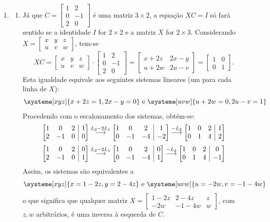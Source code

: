 \documentclass[12pt,a4paper]{article}
\makeatletter
\newenvironment{amatrix}[1]{%
  \left[\begin{array}{@{}*{#1}{c}|c@{}}
}{%
  \end{array}\right]
}
\newcommand{\grstep}[2][\relax]{%
   \ensuremath{\mathrel{
       {\mathop{\longrightarrow}\limits^{#2\mathstrut}_{
                                     \begin{subarray}{l} #1 \end{subarray}}}}}}
\makeatother
\begin{document}
\begin{enumerate}
\item
\begin{enumerate}
\item Já que $C = \begin{bmatrix}
1 & 2\\
0 & -1\\
2 & 0
\end{bmatrix}$ é uma matriz $3 \times 2$, a equação $XC = I$ só fará sentido se a identidade $I$ for $2 \times 2$ e a matriz $X$ for $2 \times 3$. Considerando $X = 
\begin{bmatrix}
x & y & z\\
u & v & w
\end{bmatrix}$, tem-se
\[
XC = 
\begin{bmatrix}
x & y & z\\
u & v & w
\end{bmatrix}
\cdot
\begin{bmatrix}
1 & 2\\
0 & -1\\
2 & 0
\end{bmatrix}
=
\begin{bmatrix}
x+2z & 2x-y\\
u+2w & 2u-v
\end{bmatrix}
=
\begin{bmatrix}
1 & 0\\
0 & 1
\end{bmatrix}.
\]
Esta igualdade equivale aos seguintes sistemas lineares (um para cada linha de $X$):
\[
\systeme[xyz]{
x+2z=1,
2x-y=0
}
\text{ e }
\systeme[uvw]{
u+2w=0,
2u-v=1
}
\]
Procedendo com o escalonamento dos sistemas, obtém-se:
\[
\begin{amatrix}{3}
1 &  0 & 2 & 1\\
2 & -1 & 0 & 0
\end{amatrix}
\grstep{ L_2 - 2 L_1 }
\begin{amatrix}{3}
1 &  0 &  2 &  1\\
0 & -1 & -4 & -2
\end{amatrix}
\grstep{ -L_2 }
\begin{amatrix}{3}
1 &  0 &  2 &  1\\
0 & 1 & 4 & 2
\end{amatrix}
\]
\[
\begin{amatrix}{3}
1 &  0 & 2 & 0\\
2 & -1 & 0 & 1
\end{amatrix}
\grstep{ L_2 - 2 L_1 }
\begin{amatrix}{3}
1 &  0 &  2 & 0\\
0 & -1 & -4 & 1
\end{amatrix}
\grstep{ -L_2 }
\begin{amatrix}{3}
1 &  0 &  2 & 0\\
0 & 1 & 4 & -1
\end{amatrix}
\]
Assim, os sistemas são equivalentes a
\[
\systeme[xyz]{
x = 1 - 2z,
y = 2 - 4z
}
\text{ e }
\systeme[uvw]{
u=-2w,
v=-1-4w
}
\]
o que significa que qualquer matriz $X = \begin{bmatrix}
1 - 2z &  2 - 4z & z\\
   -2w & -1 - 4w & w
\end{bmatrix}$, com $z,w$ arbitrários, é uma inversa à esquerda de $C$.


\end{enumerate}
\end{enumerate}
\end{document}
